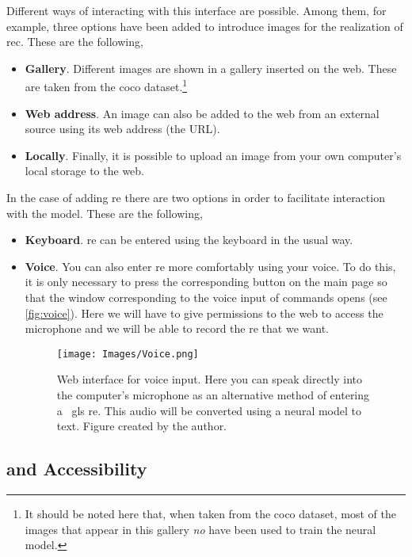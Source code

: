 Different ways of interacting with this interface are possible. Among them, for
example, three options have been added to introduce images for the realization
of \gls{rec}. These are the following,
\begin{itemize}
  \item \textbf{Gallery}. Different images are shown in a gallery inserted on
  the web. These are taken from the \gls{coco} dataset.\footnote{It should be
    noted here that, when taken from the \gls{coco} dataset, most of the images
    that appear in this gallery \emph{no} have been used to train the neural
    model.}
  \item \textbf{Web address}. An image can also be added to the web from an
  external source using its web address (the URL).
  \item \textbf{Locally}. Finally, it is possible to upload an image from your
  own computer's local storage to the web.
\end{itemize}

In the case of adding \gls{re} there are two options in order to facilitate
interaction with the model. These are the following,
\begin{itemize}
  \item \textbf{Keyboard}. \gls{re} can be entered using the keyboard in the
  usual way.
  \item \textbf{Voice}. You can also enter \gls{re} more comfortably using your
  voice. To do this, it is only necessary to press the corresponding button on
  the main page so that the window corresponding to the voice input of commands
  opens (see \vref{fig:voice}). Here we will have to give permissions to the
  web to access the microphone and we will be able to record the \gls{re} that
  we want.
  \begin{figure}[ht]
    \centering
    \texttt{[image: Images/Voice.png]}
    \caption[Web interface for voice input]{Web interface for voice input. Here
      you can speak directly into the computer's microphone as an alternative
      method of entering a \ gls {re}. This audio will be converted using a
      neural model to text. Figure created by the author.}\label{fig:voice}
  \end{figure}
\end{itemize}


\subsection{ and Accessibility}%


